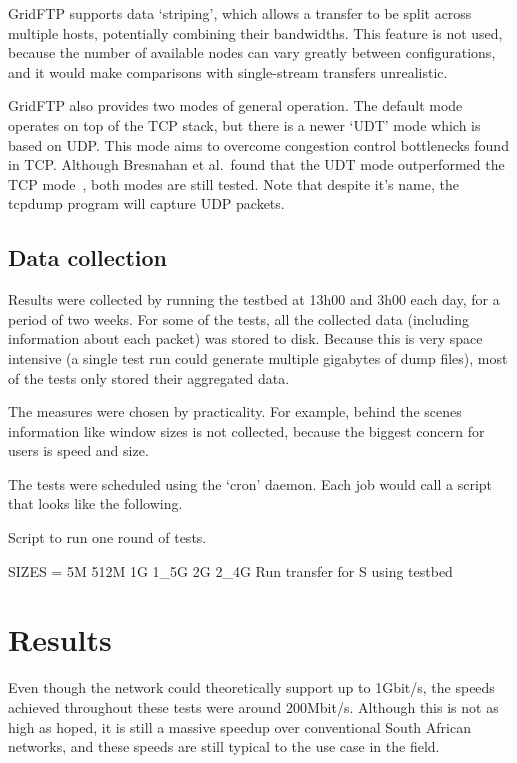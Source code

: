 \documentclass{sig-alternate-05-2015}
\begin{document}
GridFTP supports data `striping', which allows a transfer to be split across multiple hosts, potentially combining their bandwidths. This feature is not used, because the number of available nodes can vary greatly between configurations, and it would make comparisons with single-stream transfers unrealistic.

GridFTP also provides two modes of general operation. The default mode operates on top of the TCP stack, but there is a newer `UDT' mode which is based on UDP\@. This mode aims to overcome congestion control bottlenecks found in TCP\@. Although Bresnahan et al.\ found that the UDT mode outperformed the TCP mode~\cite{bresnahan2009udt}, both modes are still tested. Note that despite it's name, the tcpdump program will capture UDP packets.

\subsection{Data collection}
Results were collected by running the testbed at 13h00 and 3h00 each day, for a period of two weeks. For some of the tests, all the collected data (including information about each packet) was stored to disk. Because this is very space intensive (a single test run could generate multiple gigabytes of dump files), most of the tests only stored their aggregated data. 

The measures were chosen by practicality. For example, behind the scenes information like window sizes is not collected, because the biggest concern for users is speed and size.

The tests were scheduled using the `cron' daemon. Each job would call a script that looks like the following.

\begin{algorithm}[h]
\caption{Script to run one round of tests.}
	\begin{algorithmic}
		\STATE SIZES = 5M 512M 1G 1\_5G 2G 2\_4G
		\STATE Run transfer for S using testbed
		\ENDFOR
		\ENDFOR
	\end{algorithmic}
\label{alg:script}
\end{algorithm}

\section{Results}

Even though the network could theoretically support up to 1Gbit/s, the speeds achieved throughout these tests were around 200Mbit/s. Although this is not as high as hoped, it is still a massive speedup over conventional South African networks, and these speeds are still typical to the use case in the field.
\end{document}
